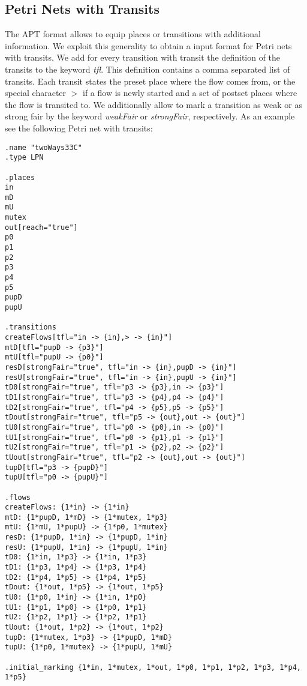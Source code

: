 \documentclass[12pt,twoside,a4paper,openright]{memoir}
\begin{document}
\subsection{Petri Nets with Transits}
\label{sec:format_pnwt}
The APT format allows to equip places or transitions with additional information.
We exploit this generality to obtain a input format for Petri nets with transits.
We add for every transition with transit the definition of the transits to the keyword \emph{tfl}.
This definition contains a comma separated list of transits.
Each transit states the preset place where the flow comes from, or the special character \(>\) if a flow is newly
started and a set of postset places where the flow is transited to.
We additionally allow to mark a transition as weak or as strong fair by the keyword \emph{weakFair} or \emph{strongFair}, respectively.
As an example see the following Petri net with transits:
\begin{lstlisting}[captionpos=b, caption=An example Petri net with transits in \tool{}'s format., label = lst:grammar,language=apt-format]
.name "twoWays33C"
.type LPN

.places
in
mD
mU
mutex
out[reach="true"]
p0
p1
p2
p3
p4
p5
pupD
pupU

.transitions
createFlows[tfl="in -> {in},> -> {in}"]
mtD[tfl="pupD -> {p3}"]
mtU[tfl="pupU -> {p0}"]
resD[strongFair="true", tfl="in -> {in},pupD -> {in}"]
resU[strongFair="true", tfl="in -> {in},pupU -> {in}"]
tD0[strongFair="true", tfl="p3 -> {p3},in -> {p3}"]
tD1[strongFair="true", tfl="p3 -> {p4},p4 -> {p4}"]
tD2[strongFair="true", tfl="p4 -> {p5},p5 -> {p5}"]
tDout[strongFair="true", tfl="p5 -> {out},out -> {out}"]
tU0[strongFair="true", tfl="p0 -> {p0},in -> {p0}"]
tU1[strongFair="true", tfl="p0 -> {p1},p1 -> {p1}"]
tU2[strongFair="true", tfl="p1 -> {p2},p2 -> {p2}"]
tUout[strongFair="true", tfl="p2 -> {out},out -> {out}"]
tupD[tfl="p3 -> {pupD}"]
tupU[tfl="p0 -> {pupU}"]

.flows
createFlows: {1*in} -> {1*in}
mtD: {1*pupD, 1*mD} -> {1*mutex, 1*p3}
mtU: {1*mU, 1*pupU} -> {1*p0, 1*mutex}
resD: {1*pupD, 1*in} -> {1*pupD, 1*in}
resU: {1*pupU, 1*in} -> {1*pupU, 1*in}
tD0: {1*in, 1*p3} -> {1*in, 1*p3}
tD1: {1*p3, 1*p4} -> {1*p3, 1*p4}
tD2: {1*p4, 1*p5} -> {1*p4, 1*p5}
tDout: {1*out, 1*p5} -> {1*out, 1*p5}
tU0: {1*p0, 1*in} -> {1*in, 1*p0}
tU1: {1*p1, 1*p0} -> {1*p0, 1*p1}
tU2: {1*p2, 1*p1} -> {1*p2, 1*p1}
tUout: {1*out, 1*p2} -> {1*out, 1*p2}
tupD: {1*mutex, 1*p3} -> {1*pupD, 1*mD}
tupU: {1*p0, 1*mutex} -> {1*pupU, 1*mU}

.initial_marking {1*in, 1*mutex, 1*out, 1*p0, 1*p1, 1*p2, 1*p3, 1*p4, 1*p5}
\end{lstlisting}
\end{document}
